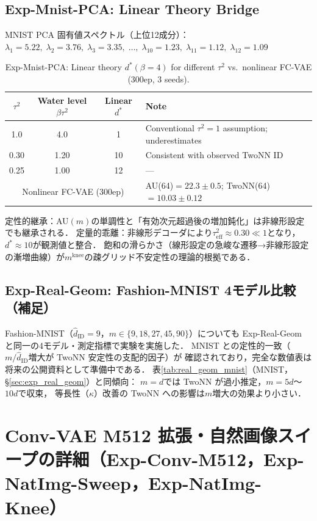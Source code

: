 \documentclass[11pt,a4paper]{jsarticle}
\newcommand{\kap}{\kappa}
\newcommand{\mknee}{m^{\mathrm{knee}}}
\begin{document}
\subsection*{Exp-Mnist-PCA: Linear Theory Bridge}

MNIST PCA 固有値スペクトル（上位12成分）：
$\lambda_1=5.22,\; \lambda_2=3.76,\; \lambda_3=3.35,\;\ldots,\;\lambda_{10}=1.23,\; \lambda_{11}=1.12,\; \lambda_{12}=1.09$

\begin{table}[H]
\centering
\caption{Exp-Mnist-PCA: Linear theory $d^*(\beta=4)$ for different $\tau^2$ vs.\ nonlinear FC-VAE (300ep, 3 seeds).}
\label{tab:theory_pred}
\small
\begin{tabular}{ccc|l}
\toprule
$\tau^2$ & Water level $\beta\tau^2$ & Linear $d^*$ & Note \\
\midrule
1.0  & 4.0  & 1   & Conventional $\tau^2=1$ assumption; underestimates \\
0.30 & 1.20 & 10  & Consistent with observed TwoNN ID \\
0.25 & 1.00 & 12  & --- \\
\midrule
\multicolumn{3}{c|}{Nonlinear FC-VAE (300ep)} & AU(64)$=22.3\pm0.5$; TwoNN(64)$=10.03\pm0.12$ \\
\bottomrule
\end{tabular}
\end{table}

定性的継承：AU$(m)$の単調性と「有効次元超過後の増加鈍化」は非線形設定でも継承される．
定量的乖離：非線形デコーダにより$\tau^2_\mathrm{eff} \approx 0.30 \ll 1$となり，$d^* \approx 10$が観測値と整合．
飽和の滑らかさ（線形設定の急峻な遷移→非線形設定の漸増曲線）が$\mknee$の疎グリッド不安定性の理論的根拠である．

\subsection*{Exp-Real-Geom: Fashion-MNIST 4モデル比較（補足）}

Fashion-MNIST（$\hat{d}_\mathrm{ID}=9$，$m \in \{9,18,27,45,90\}$）についても
Exp-Real-Geom と同一の4モデル・測定指標で実験を実施した．
MNIST との定性的一致（$m/\hat{d}_\mathrm{ID}$増大が TwoNN 安定性の支配的因子）が
確認されており，完全な数値表は将来の公開資料として準備中である．
表\ref{tab:real_geom_mnist}（MNIST，§\ref{sec:exp_real_geom}）と同傾向：
$m = d$では TwoNN が過小推定，$m = 5d$〜$10d$で収束，
等長性（$\kap$）改善の TwoNN への影響は$m$増大の効果より小さい．

\section{Conv-VAE M512 拡張・自然画像スイープの詳細（Exp-Conv-M512，Exp-NatImg-Sweep，Exp-NatImg-Knee）}\label{app:convvae_natimg}
\end{document}
